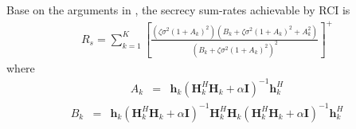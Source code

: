 \documentclass[12pt,journal,draftclsnofoot,onecolumn]{IEEEtran}
\begin{document}
Base on the arguments in \cite{geraci2012secrecy}, the secrecy sum-rates achievable by RCI is
\begin{eqnarray}
R_s = \sum_{k=1}^{K}\left[\frac{\left(\zeta\sigma^2(1+ A_k)^2\right)\left(B_k + \zeta\sigma^2(1+ A_k)^2 + A_k^2\right)}{\left(B_k + \zeta\sigma^2(1+ A_k)^2\right)^2}\right]^+ \label{eq:sum_rates}
\end{eqnarray}
where
\begin{eqnarray} \label{eq:A_k}
A_k &=& \mathbf{h}_k\left(\mathbf{H}_k^H\mathbf{H}_k + \alpha\mathbf{I}\right)^{-1}\mathbf{h}_k^H
\end{eqnarray}
\begin{eqnarray}
B_k &=& \mathbf{h}_k\left(\mathbf{H}_k^H\mathbf{H}_k + \alpha\mathbf{I}\right)^{-1}\mathbf{H}_k^H\mathbf{H}_k\left(\mathbf{H}_k^H\mathbf{H}_k + \alpha\mathbf{I}\right)^{-1}\mathbf{h}_k^H \label{eq:B_k}
\end{eqnarray}
\end{document}
